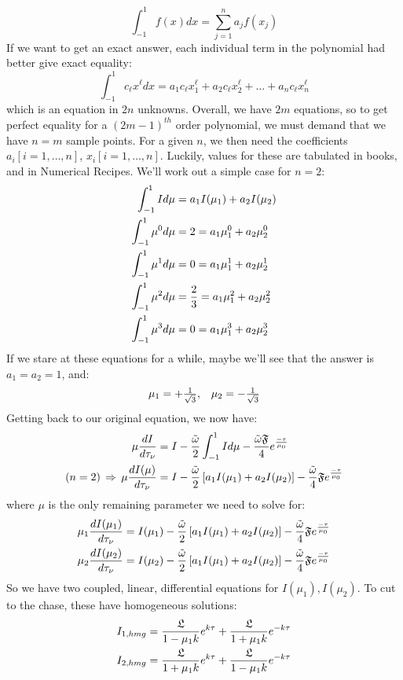 \documentclass[11pt]{article}
\def\imply{\Rightarrow}
\begin{document}
$$\int_{-1}^1{f(x)dx}=\sum_{j=1}^n{a_jf(x_j)}$$
If we want to get an exact answer, each individual term in the polynomial had
better give exact equality:
$$\int_{-1}^1{c_\ell x^\ell dx}=a_1c_\ell x_1^\ell+a_2c_\ell x_2^\ell+\dots
+a_nc_\ell x_n^\ell$$
which is an equation in $2n$ unknowns.  Overall, we have $2m$ equations, so
to get perfect equality for a $(2m-1)^{th}$ order polynomial, we must
demand that we have $n=m$ sample points.  For a given $n$, we then need
the coefficients $a_i[i=1,\dots,n]$, $x_i[i=1,\dots,n]$.  Luckily, values for
these are tabulated in books, and in Numerical Recipes.  We'll work out a 
simple case for $n=2$:
\def\intmoo#1{\int_{-1}^1{#1}}
$$\begin{aligned}\int_{-1}^1{Id\mu}&=a_1I(\mu_1)+a_2I(\mu_2)\\ 
\intmoo{\mu^0d\mu}&=2=a_1\mu_1^0+a_2\mu_2^0\\ 
\intmoo{\mu^1d\mu}&=0=a_1\mu_1^1+a_2\mu_2^1\\ 
\intmoo{\mu^2d\mu}&={2\over3}=a_1\mu_1^2+a_2\mu_2^2\\ 
\intmoo{\mu^3d\mu}&=0=a_1\mu_1^3+a_2\mu_2^3\\ \end{aligned}$$
If we stare at these equations for a while, maybe we'll see that the answer
is $a_1=a_2=1$, and:
$$\begin{matrix}\mu_1=+{1\over\sqrt{3}},&\mu_2=-{1\over\sqrt{3}}\end{matrix}$$
Getting back to our original equation, we now have:
\def\aiaio{\left[a_1I(\mu_1)+a_2I(\mu_2)\right]}
$$\begin{aligned}\mu\ddtau{I}
&=I-{\wt\over2}\intmoo{Id\mu}-{\wt\mathfrak{F}\over4}e^{-\tau\over\mu_0}\\ 
(n=2)\,\imply\,\mu\ddtau{I(\mu)}&=I-{\wt\over2}\aiaio
-{\wt\over4}\mathfrak{F} e^{-\tau\over\mu_0}\\ \end{aligned}$$
where $\mu$ is the only remaining parameter we need to solve for:
$$\begin{aligned}\mu_1\ddtau{I(\mu_1)}&=I(\mu_1)-{\wt\over2}\aiaio-{\wt\over4}\mathfrak{F}
e^{-\tau\over\mu_0}\\ 
\mu_2\ddtau{I(\mu_2)}&=I(\mu_2)-{\wt\over2}\aiaio-{\wt\over4}\mathfrak{F}
e^{-\tau\over\mu_0}\\ \end{aligned}$$
So we have two coupled, linear, differential equations for $I(\mu_1),I(\mu_2)$.
To cut to the chase, these have homogeneous solutions:
$$\begin{aligned}I_{1,hmg}&=
{\mathfrak{L}\over1-\mu_1k}e^{k\tau}+{\mathfrak{L}\over1+\mu_1k}e^{-k\tau}\\ 
I_{2,hmg}&={\mathfrak{L}\over1+\mu_1k}e^{k\tau}+{\mathfrak{L}\over1-\mu_1k}e^{-k\tau}\\ \end{aligned}$$
\end{document}
